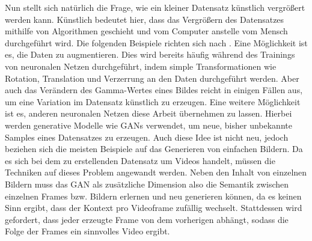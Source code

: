 Nun stellt sich natürlich die Frage, wie ein kleiner Datensatz künstlich
vergrößert werden kann. Künstlich bedeutet hier, dass das Vergrößern des
Datensatzes mithilfe von Algorithmen geschieht und vom Computer anstelle vom
Mensch durchgeführt wird. Die folgenden Beispiele richten sich nach
\cite{shorten2019}. Eine Möglichkeit ist es, die Daten zu augmentieren.  Dies
wird bereits häufig während des Trainings von neuronalen Netzen durchgeführt,
indem simple Transformationen wie Rotation, Translation und Verzerrung an den
Daten durchgeführt werden. Aber auch das Verändern des Gamma-Wertes eines Bildes
reicht in einigen Fällen aus, um eine Variation im Datensatz künstlich zu
erzeugen. Eine weitere Möglichkeit ist es, anderen neuronalen Netzen diese
Arbeit übernehmen zu lassen. Hierbei werden generative Modelle wie GANs
verwendet, um neue, bisher unbekannte Samples eines Datensatzes zu erzeugen.
Auch diese Idee ist nicht neu, jedoch beziehen sich die meisten Beispiele auf
das Generieren von einfachen Bildern. Da es sich bei dem zu erstellenden
Datensatz um Videos handelt, müssen die Techniken auf dieses Problem angewandt
werden. Neben den Inhalt von einzelnen Bildern muss das GAN als zusätzliche
Dimension also die Semantik zwischen einzelnen Frames bzw.  Bildern erlernen und
neu generieren können, da es keinen Sinn ergibt, dass der Kontext pro Videoframe
zufällig wechselt. Stattdessen wird gefordert, dass jeder erzeugte Frame von dem
vorherigen abhängt, sodass die Folge der Frames ein sinnvolles Video ergibt.

